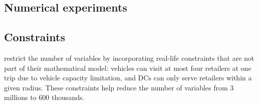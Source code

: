 \documentclass[a4paper,10pt]{article}
\begin{document}
\begin{linenumbers}


\section{Numerical experiments}
\label{sec:expe}


\subsection{Constraints}

 \cite{Zheng2019} restrict the number of variables by incorporating real-life constraints that are not part of their mathematical model: 
 vehicles can visit at most four retailers at one trip due to vehicle capacity limitation, and DCs can only serve retailers within a given radius. 
 These constraints help reduce the number of variables from 3 millions to 600 thousands.
 

\end{linenumbers}
\end{document}
